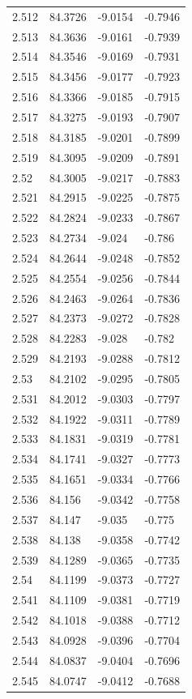 \begin{tabular}{llll}
2.512 & 84.3726 & -9.0154 & -0.7946 \\
2.513 & 84.3636 & -9.0161 & -0.7939 \\
2.514 & 84.3546 & -9.0169 & -0.7931 \\
2.515 & 84.3456 & -9.0177 & -0.7923 \\
2.516 & 84.3366 & -9.0185 & -0.7915 \\
2.517 & 84.3275 & -9.0193 & -0.7907 \\
2.518 & 84.3185 & -9.0201 & -0.7899 \\
2.519 & 84.3095 & -9.0209 & -0.7891 \\
2.52 & 84.3005 & -9.0217 & -0.7883 \\
2.521 & 84.2915 & -9.0225 & -0.7875 \\
2.522 & 84.2824 & -9.0233 & -0.7867 \\
2.523 & 84.2734 & -9.024 & -0.786 \\
2.524 & 84.2644 & -9.0248 & -0.7852 \\
2.525 & 84.2554 & -9.0256 & -0.7844 \\
2.526 & 84.2463 & -9.0264 & -0.7836 \\
2.527 & 84.2373 & -9.0272 & -0.7828 \\
2.528 & 84.2283 & -9.028 & -0.782 \\
2.529 & 84.2193 & -9.0288 & -0.7812 \\
2.53 & 84.2102 & -9.0295 & -0.7805 \\
2.531 & 84.2012 & -9.0303 & -0.7797 \\
2.532 & 84.1922 & -9.0311 & -0.7789 \\
2.533 & 84.1831 & -9.0319 & -0.7781 \\
2.534 & 84.1741 & -9.0327 & -0.7773 \\
2.535 & 84.1651 & -9.0334 & -0.7766 \\
2.536 & 84.156 & -9.0342 & -0.7758 \\
2.537 & 84.147 & -9.035 & -0.775 \\
2.538 & 84.138 & -9.0358 & -0.7742 \\
2.539 & 84.1289 & -9.0365 & -0.7735 \\
2.54 & 84.1199 & -9.0373 & -0.7727 \\
2.541 & 84.1109 & -9.0381 & -0.7719 \\
2.542 & 84.1018 & -9.0388 & -0.7712 \\
2.543 & 84.0928 & -9.0396 & -0.7704 \\
2.544 & 84.0837 & -9.0404 & -0.7696 \\
2.545 & 84.0747 & -9.0412 & -0.7688 \\

\end{tabular}
